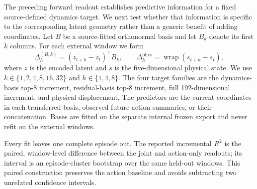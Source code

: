 \documentclass{article}
\begin{document}
The preceding forward readout establishes predictive information for a fixed
source-defined dynamics target. We next test whether that information is
specific to the corresponding latent geometry rather than a generic benefit
of adding coordinates. Let $B$ be a source-fitted orthonormal basis and let
$B_{k}$ denote its first $k$ columns. For each external window we form
\begin{equation}
\Delta^{(B,k)}_{h} = (z_{t+h}-z_t)^\top B_k,
\qquad
\Delta^{\mathrm{phys}}_{h}
 = \operatorname{wrap}(s_{t+h}-s_t),
\label{eq:supp-rank-target}
\end{equation}
where $z$ is the encoded latent and $s$ is the five-dimensional physical
state. We use $k\in\{1,2,4,8,16,32\}$ and $h\in\{1,4,8\}$. The four
target families are the dynamics-basis top-8 increment, residual-basis top-8
increment, full 192-dimensional increment, and physical displacement. The
predictors are the current coordinates in each transferred basis, observed
future-action summaries, or their concatenation. Bases are fitted on the
separate internal frozen export and never refit on the external windows.

Every fit leaves one complete episode out. The reported incremental $R^2$ is
the paired, window-level difference between the joint and action-only
readouts; its interval is an episode-cluster bootstrap over the same held-out
windows. This paired construction preserves the action baseline and avoids
subtracting two unrelated confidence intervals.

\begin{table}[H]
\centering
\scriptsize
\setlength{\tabcolsep}{3pt}
\caption{Target-specificity controls for the transferred top-8 subspaces. Entries are paired incremental $R^2$ over the observed-action baseline with 95\% episode-cluster bootstrap intervals. The target is fixed within each row; positive values mean that the indicated current latent coordinates add predictive information beyond the action summary.}
\label{tab:supp-rank-target-controls}
\end{table}
\end{document}

